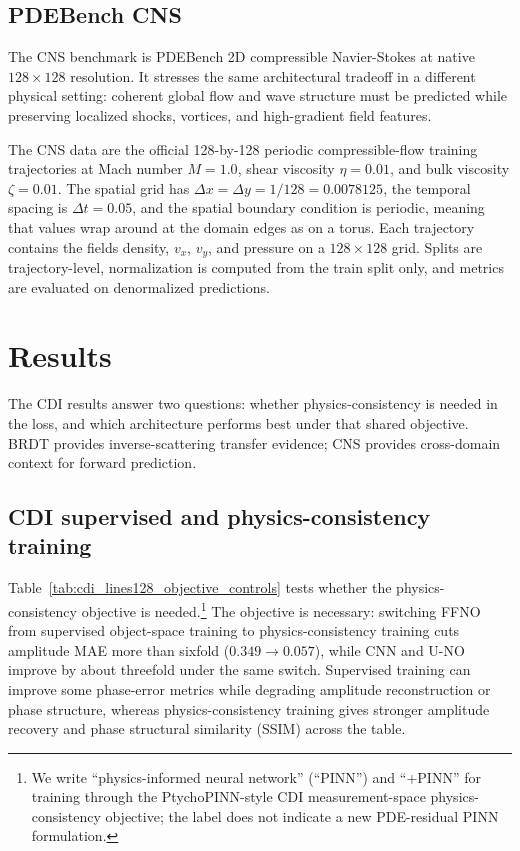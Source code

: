 \documentclass[11pt]{article}
\begin{document}
\subsection{PDEBench CNS}

The CNS benchmark is PDEBench 2D compressible Navier-Stokes at native
$128\times128$ resolution. It stresses the same architectural tradeoff in a
different physical setting: coherent global flow and wave structure must be
predicted while preserving localized shocks, vortices, and high-gradient field
features.

The CNS data are the official 128-by-128 periodic compressible-flow
training trajectories at Mach number $M=1.0$, shear viscosity
$\eta=0.01$, and bulk viscosity $\zeta=0.01$. The spatial grid has
$\Delta x=\Delta y=1/128=0.0078125$, the temporal spacing is
$\Delta t=0.05$, and the spatial boundary condition is periodic, meaning that
values wrap around at the domain edges as on a torus. Each trajectory contains
the fields density, $v_x$, $v_y$, and pressure on a $128\times128$ grid.
Splits are trajectory-level, normalization is computed from the train split
only, and metrics are evaluated on denormalized predictions.

\section{Results}

The CDI results answer two questions: whether physics-consistency
is needed in the loss, and which architecture performs best under that shared
objective. BRDT provides inverse-scattering transfer evidence; CNS provides
cross-domain context for forward prediction.

\subsection{CDI supervised and physics-consistency training}

Table~\ref{tab:cdi_lines128_objective_controls} tests whether the
physics-consistency objective is needed.\footnote{We write ``physics-informed
neural network'' (``PINN'') and
``+PINN'' for training through the PtychoPINN-style CDI measurement-space
physics-consistency objective; the label does not indicate a new PDE-residual
PINN formulation.} The objective is necessary: switching FFNO from supervised
object-space training to physics-consistency training cuts amplitude MAE
more than sixfold ($0.349 \to 0.057$), while CNN and U-NO improve by about
threefold under the same switch. Supervised training can improve some phase-error metrics
while degrading amplitude reconstruction or phase structure, whereas
physics-consistency training gives stronger amplitude recovery and phase
structural similarity (SSIM) \cite{ssim} across the table.
\end{document}

